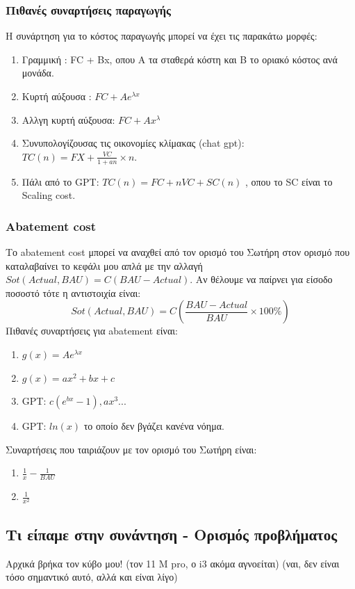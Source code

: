 \documentclass[a4paper,twoside,10pt]{article}
\begin{document}
\subsubsection{Πιθανές συναρτήσεις παραγωγής}
Η συνάρτηση για το κόστος παραγωγής μπορεί να έχει τις παρακάτω μορφές:
\begin{enumerate}
\item Γραμμική : FC + Bx, οπου Α τα σταθερά κόστη και B το οριακό κόστος ανά μονάδα.
\item Κυρτή αύξουσα : $FC+ Ae^{\lambda x}$
\item Αλλγη κυρτή αύξουσα: $FC + Αx^\lambda$
\item Συνυπολογίζουσας τις οικονομίες κλίμακας (chat gpt): $TC(n) = FX + \frac{VC}{1+an} \times n$. 
\item Πάλι από το GPT: $TC(n) = FC + nVC + SC(n)$ , οπου το SC είναι το Scaling cost.
\end{enumerate}
\subsubsection{Abatement cost}
Το abatement cost μπορεί να αναχθεί από τον ορισμό του Σωτήρη στον ορισμό που καταλαβαίνει το κεφάλι μου απλά με την αλλαγή $Sot(Actual, BAU) = C(BAU-Actual)$. Αν θέλουμε να παίρνει για είσοδο ποσοστό τότε η αντιστοιχία είναι: 
$$ Sot(Actual, BAU) = C(\frac{BAU-Actual}{BAU}\times 100\%)$$
Πιθανές συναρτήσεις για abatement είναι:
\begin{enumerate}
\item   $g(x) = Ae^{\lambda x}$
\item  $g(x) = ax^2 + bx+ c$
\item  GPT: $c(e^{bx}-1), ax^3 ...$
\item  GPT: $ln(x)$ το οποίο δεν βγάζει κανένα νόημα. 
\end{enumerate}

Συναρτήσεις που ταιριάζουν με τον ορισμό του Σωτήρη είναι:
\begin{enumerate}
\item $\frac{1}{x} - \frac{1}{BAU}$
\item $\frac{1}{x^2}$
\end{enumerate}

\subsection{Τι είπαμε στην συνάντηση - Ορισμός προβλήματος}

Αρχικά βρήκα τον κύβο μου! (τον 11 M pro, ο i3 ακόμα αγνοείται) (ναι, δεν είναι τόσο σημαντικό αυτό, αλλά και είναι λίγο)
\end{document}
